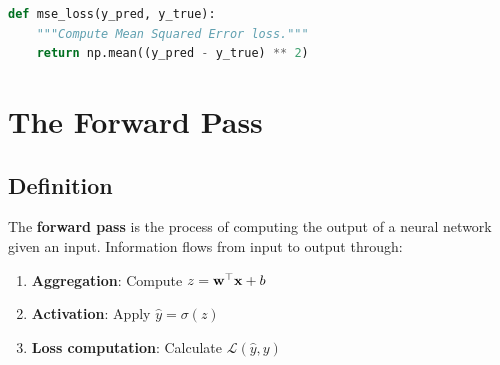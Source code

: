 \begin{lstlisting}[language=Python, caption=Mean Squared Error Implementation]
def mse_loss(y_pred, y_true):
    """Compute Mean Squared Error loss."""
    return np.mean((y_pred - y_true) ** 2)
\end{lstlisting}


\section{The Forward Pass}

\subsection{Definition}

The \textbf{forward pass} is the process of computing the output of a neural network given an input. Information flows from input to output through:

\begin{enumerate}
    \item \textbf{Aggregation}: Compute $z = \mathbf{w}^\top \mathbf{x} + b$
    \item \textbf{Activation}: Apply $\hat{y} = \sigma(z)$
    \item \textbf{Loss computation}: Calculate $\mathcal{L}(\hat{y}, y)$
\end{enumerate}

\begin{center}
\end{center}

